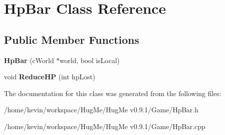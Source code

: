 \hypertarget{classHpBar}{
\section{HpBar Class Reference}
\label{classHpBar}
}
\subsection*{Public Member Functions}
\begin{DoxyCompactItemize}
\item 
\hypertarget{classHpBar_ab7308dcda24cad121b9eea5f16f0196d}{
{\bfseries HpBar} (cWorld $\ast$world, bool isLocal)}
\label{classHpBar_ab7308dcda24cad121b9eea5f16f0196d}

\item 
\hypertarget{classHpBar_a2d64d6ec33cd462d243e0ebf910f6dcf}{
void {\bfseries ReduceHP} (int hpLost)}
\label{classHpBar_a2d64d6ec33cd462d243e0ebf910f6dcf}

\end{DoxyCompactItemize}


The documentation for this class was generated from the following files:\begin{DoxyCompactItemize}
\item 
/home/kevin/workspace/HugMe/HugMe v0.9.1/Game/HpBar.h\item 
/home/kevin/workspace/HugMe/HugMe v0.9.1/Game/HpBar.cpp\end{DoxyCompactItemize}
